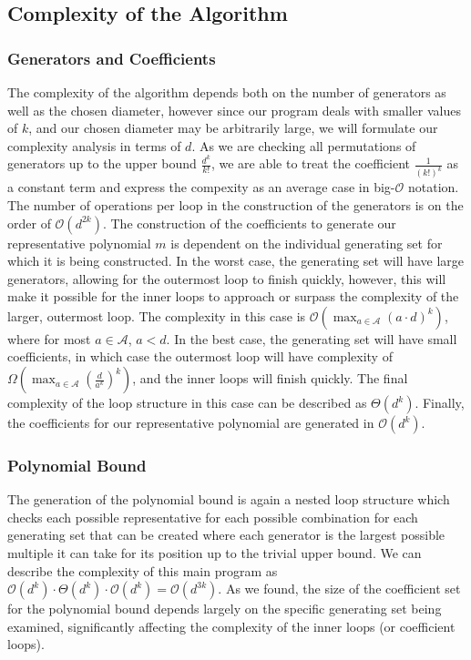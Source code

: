\subsection{Complexity of the Algorithm}

\subsubsection{Generators and Coefficients}

The complexity of the algorithm depends both on the number of generators as well as the chosen diameter, however since our program deals with smaller values of $k$, and our chosen diameter may be arbitrarily large, we will formulate our complexity analysis in terms of $d$. As we are checking all permutations of generators up to the upper bound $\frac{d^k}{k!}$, we are able to treat the coefficient $\frac{1}{(k!)^{k}}$ as a constant term and express the compexity as an average case in big-$\mathcal{O}$ notation. The number of operations per loop in the construction of the generators is on the order of $\mathcal{O}(d^{2k})$. The construction of the coefficients to generate our representative polynomial $m$ is dependent on the individual generating set for which it is being constructed. In the worst case, the generating set will have large generators, allowing for the outermost loop to finish quickly, however, this will make it possible for the inner loops to approach or surpass the complexity of the larger, outermost loop. The complexity in this case is $\mathcal{O}(\max_{a \in \mathscr{A}}(a \cdot d)^k)$, where for most $a \in \mathscr{A}$, $a < d$. In the best case, the generating set will have small coefficients, in which case the outermost loop will have complexity of $\Omega(\max_{a \in \mathscr{A}} (\frac{d}{a^k})^k)$, and the inner loops will finish quickly. The final complexity of the loop structure in this case can be described as $\Theta(d^k)$. Finally, the coefficients for our representative polynomial are generated in $\mathcal{O}(d^k)$.

\subsubsection{Polynomial Bound}

The generation of the polynomial bound is again a nested loop structure which checks each possible representative for each possible combination for each generating set that can be created where each generator is the largest possible multiple it can take for its position up to the trivial upper bound. We can describe the complexity of this main program as $\mathcal{O}(d^k) \cdot \Theta(d^k) \cdot \mathcal{O}(d^k) = \mathcal{O}(d^{3k})$. As we found, the size of the coefficient set for the polynomial bound depends largely on the specific generating set being examined, significantly affecting the complexity of the inner loops (or coefficient loops).
